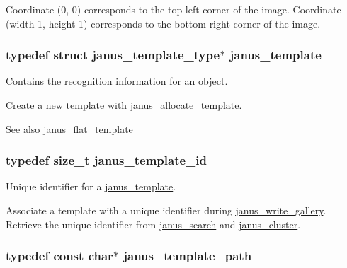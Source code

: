 Coordinate (0, 0) corresponds to the top-\/left corner of the image. Coordinate (width-\/1, height-\/1) corresponds to the bottom-\/right corner of the image. \hypertarget{group__janus_gaabac6b357615bbd03a082c714190e2d0}{}
\subsubsection[{janus\+\_\+template}]{\setlength{\rightskip}{0pt plus 5cm}typedef struct janus\+\_\+template\+\_\+type$\ast$ {\bf janus\+\_\+template}}\label{group__janus_gaabac6b357615bbd03a082c714190e2d0}


Contains the recognition information for an object. 

Create a new template with \hyperlink{group__janus_ga8619857e68a2dacee603313b042f2fcc}{janus\+\_\+allocate\+\_\+template}. \begin{DoxySeeAlso}{See also}
janus\+\_\+flat\+\_\+template 
\end{DoxySeeAlso}
\hypertarget{group__janus_ga666a973aaa28bebd89ea5da37853bb87}{}
\subsubsection[{janus\+\_\+template\+\_\+id}]{\setlength{\rightskip}{0pt plus 5cm}typedef size\+\_\+t {\bf janus\+\_\+template\+\_\+id}}\label{group__janus_ga666a973aaa28bebd89ea5da37853bb87}


Unique identifier for a \hyperlink{group__janus_gaabac6b357615bbd03a082c714190e2d0}{janus\+\_\+template}. 

Associate a template with a unique identifier during \hyperlink{group__janus_ga874a3668ca302fbff98e0df4cfa1a31c}{janus\+\_\+write\+\_\+gallery}. Retrieve the unique identifier from \hyperlink{group__janus_ga3ad534c34ae38082eb49ce8457545653}{janus\+\_\+search} and \hyperlink{group__janus_gae282d9361c185efa20f13f0edcde283e}{janus\+\_\+cluster}. \hypertarget{group__janus_gad1ec012594c24085ba7110ad96a2db22}{}
\subsubsection[{janus\+\_\+template\+\_\+path}]{\setlength{\rightskip}{0pt plus 5cm}typedef const char$\ast$ {\bf janus\+\_\+template\+\_\+path}}\label{group__janus_gad1ec012594c24085ba7110ad96a2db22}


